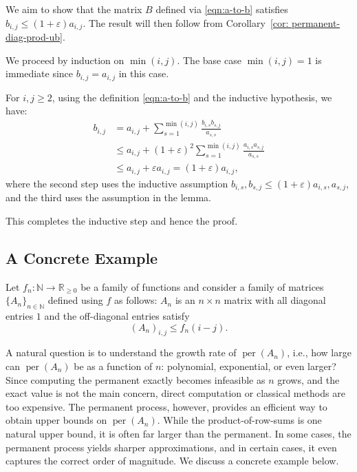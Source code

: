 \documentclass[11pt]{article}
\makeatletter
\theoremstyle{definition}
\newenvironment{proof}[1][\protect\proofname]{\par
	\normalfont\topsep6\p@\@plus6\p@\relax
	\trivlist
	\itemindent\parindent        %
	\item[\hskip\labelsep\scshape #1]\ignorespaces
}{%
	\endtrivlist\@endpefalse
}
\providecommand{\proofname}{Proof}
\DeclareMathOperator{\per}{per}
\makeatother
\begin{document}
\applicationbound*
\begin{proof}
	We aim to show that the matrix \( B \) defined via \eqref{eqn:a-to-b} satisfies \( b_{i,j} \le (1+\varepsilon) a_{i,j} \). The result will then follow from Corollary~\ref{cor: permanent-diag-prod-ub}.
	
	We proceed by induction on \( \min(i,j) \). The base case \( \min(i,j) = 1 \) is immediate since \( b_{i,j} = a_{i,j} \) in this case.
	
	For \( i,j \ge 2 \), using the definition \eqref{eqn:a-to-b} and the inductive hypothesis, we have:
	\begin{align*}
		b_{i,j} &= a_{i,j} + \sum_{ s = 1}^{\min(i,j)} \frac{b_{i,s} b_{s,j}}{a_{s,s}} \\
		&\le a_{i,j} + (1+\varepsilon)^2 \sum_{ s = 1}^{\min(i,j)} \frac{a_{i,s} a_{s,j}}{a_{s,s}} \\
		&\le a_{i,j} + \varepsilon a_{i,j} = (1+\varepsilon) a_{i,j},
	\end{align*}
	where the second step uses the inductive assumption \( b_{i,s}, b_{s,j} \le (1+\varepsilon) a_{i,s}, a_{s,j} \), and the third uses the assumption in the lemma.
	
	This completes the inductive step and hence the proof.
\end{proof}


\subsection{A Concrete Example}
Let $f_n: \mathbb{N} \rightarrow \mathbb{R}_{\geq 0}$ be a family of functions and consider a family of matrices $\{ A_n\}_{n \in \mathbb{N}}$ defined using $f$ as follows: $A_n$ is an $n \times n$ matrix with all diagonal entries $1$ and the off-diagonal entries satisfy 
\begin{equation*}
    (A_n)_{i,j} \leq f_n(i-j) .
    \end{equation*}


A natural question is to understand the growth rate of $\per(A_n)$, i.e., how large can $\per(A_n)$ be as a function of $n$: polynomial, exponential, or even larger? Since computing the permanent exactly becomes infeasible as $n$ grows, and the exact value is not the main concern, direct computation or classical methods are too expensive. The permanent process, however, provides an efficient way to obtain upper bounds on $\per(A_n)$. While the product-of-row-sums is one natural upper bound, it is often far larger than the permanent. In some cases, the permanent process yields sharper approximations, and in certain cases, it even captures the correct order of magnitude. We discuss a concrete example below.
\end{document}
